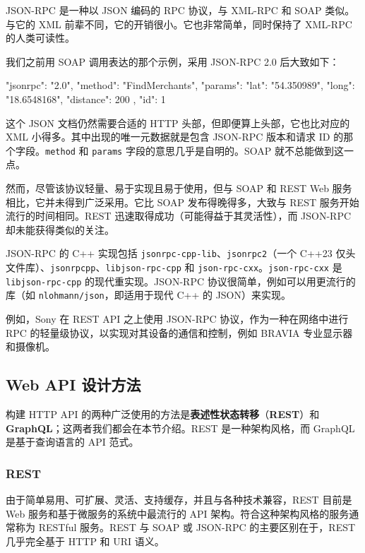\label{idx:1615}
\label{idx:1616}
\label{idx:1617}
JSON-RPC 是一种以 JSON 编码的 RPC 协议，与 XML-RPC 和 SOAP 类似。与它的 XML 前辈不同，它的开销很小。它也非常简单，同时保持了 XML-RPC 的人类可读性。

我们之前用 SOAP 调用表达的那个示例，采用 JSON-RPC 2.0 后大致如下：

\begin{codebox}[json]
{
  "jsonrpc": "2.0",
  "method": "FindMerchants",
  "params": {
    "lat": "54.350989",
    "long": "18.6548168",
    "distance": 200
  },
  "id": 1
}
\end{codebox}

这个 JSON 文档仍然需要合适的 HTTP 头部，但即便算上头部，它也比对应的 XML 小得多。其中出现的唯一元数据就是包含 JSON-RPC 版本和请求 ID 的那个字段。\texttt{method} 和 \texttt{params} 字段的意思几乎是自明的。SOAP 就不总能做到这一点。

\label{idx:1618}
然而，尽管该协议轻量、易于实现且易于使用，但与 SOAP 和 REST Web 服务相比，它并未得到广泛采用。它比 SOAP 发布得晚得多，大致与 REST 服务开始流行的时间相同。REST 迅速取得成功（可能得益于其灵活性），而 JSON-RPC 却未能获得类似的关注。

\label{idx:1619}
JSON-RPC 的 C++ 实现包括 \texttt{jsonrpc-cpp-lib}、\texttt{jsonrpc2}（一个 C++23 仅头文件库）、\texttt{jsonrpcpp}、\texttt{libjson-rpc-cpp} 和 \texttt{json-rpc-cxx}。\texttt{json-rpc-cxx} 是 \texttt{libjson-rpc-cpp} 的现代重实现。JSON-RPC 协议很简单，例如可以用更流行的库（如 \texttt{nlohmann/\allowbreak{}json}，即适用于现代 C++ 的 JSON）来实现。

例如，Sony 在 REST API 之上使用 JSON-RPC 协议，作为一种在网络中进行 RPC 的轻量级协议，以实现对其设备的通信和控制，例如 BRAVIA 专业显示器和摄像机。

\subsection{Web API 设计方法}

\label{idx:1620}
构建 HTTP API 的两种广泛使用的方法是\textbf{表述性状态转移}（\textbf{REST}）和 \textbf{GraphQL}；这两者我们都会在本节介绍。REST 是一种架构风格，而 GraphQL 是基于查询语言的 API 范式。

\subsubsection{REST}

\label{idx:1621}
\label{idx:1622}
\label{idx:1623}
由于简单易用、可扩展、灵活、支持缓存，并且与各种技术兼容，REST 目前是 Web 服务和基于微服务的系统中最流行的 API 架构。符合这种架构风格的服务通常称为 RESTful 服务。REST 与 SOAP 或 JSON-RPC 的主要区别在于，REST 几乎完全基于 HTTP 和 URI 语义。

